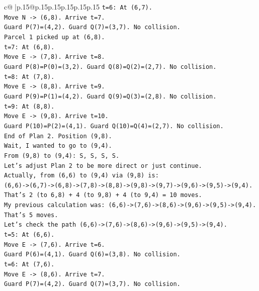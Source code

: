 \documentclass{article}
\begin{document}
{\begin{supertabular}{c@{$\;$}|p{.15\linewidth}@{}p{.15\linewidth}p{.15\linewidth}p{.15\linewidth}p{.15\linewidth}p{.15\linewidth}}
{{{\texttt{t=6: At (6,7).} \\
\texttt{Move N {-}> (6,8). Arrive t=7.} \\
\texttt{Guard P(7)=(4,2). Guard Q(7)=(3,7). No collision.} \\
\texttt{Parcel 1 picked up at (6,8).} \\
\texttt{t=7: At (6,8).} \\
\texttt{Move E {-}> (7,8). Arrive t=8.} \\
\texttt{Guard P(8)=P(0)=(3,2). Guard Q(8)=Q(2)=(2,7). No collision.} \\
\texttt{t=8: At (7,8).} \\
\texttt{Move E {-}> (8,8). Arrive t=9.} \\
\texttt{Guard P(9)=P(1)=(4,2). Guard Q(9)=Q(3)=(2,8). No collision.} \\
\texttt{t=9: At (8,8).} \\
\texttt{Move E {-}> (9,8). Arrive t=10.} \\
\texttt{Guard P(10)=P(2)=(4,1). Guard Q(10)=Q(4)=(2,7). No collision.} \\
\texttt{End of Plan 2. Position (9,8).} \\
\texttt{Wait, I wanted to go to (9,4).} \\
\texttt{From (9,8) to (9,4): S, S, S, S.} \\
\texttt{Let's adjust Plan 2 to be more direct or just continue.} \\
\texttt{Actually, from (6,6) to (9,4) via (9,8) is:} \\
\texttt{(6,6){-}>(6,7){-}>(6,8){-}>(7,8){-}>(8,8){-}>(9,8){-}>(9,7){-}>(9,6){-}>(9,5){-}>(9,4).} \\
\texttt{That's 2 (to 6,8) + 4 (to 9,8) + 4 (to 9,4) = 10 moves.} \\
\texttt{My previous calculation was: (6,6){-}>(7,6){-}>(8,6){-}>(9,6){-}>(9,5){-}>(9,4). That's 5 moves.} \\
\texttt{Let's check the path (6,6){-}>(7,6){-}>(8,6){-}>(9,6){-}>(9,5){-}>(9,4).} \\
\texttt{t=5: At (6,6).} \\
\texttt{Move E {-}> (7,6). Arrive t=6.} \\
\texttt{Guard P(6)=(4,1). Guard Q(6)=(3,8). No collision.} \\
\texttt{t=6: At (7,6).} \\
\texttt{Move E {-}> (8,6). Arrive t=7.} \\
\texttt{Guard P(7)=(4,2). Guard Q(7)=(3,7). No collision.} \\
}}}
\end{supertabular}}
\end{document}
